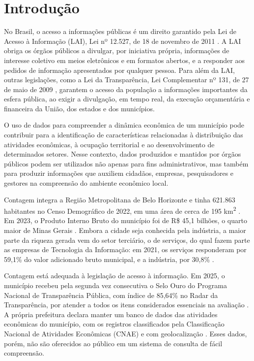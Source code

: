 \section{Introdução}

No Brasil, o acesso a informações públicas é um direito garantido pela Lei de Acesso à Informação (LAI), Lei nº 12.527, de 18 de novembro de 2011 \cite{brasil2011}.
A LAI obriga os órgãos públicos a divulgar, por iniciativa própria, informações de interesse coletivo em meios eletrônicos e em formatos abertos, e a responder aos pedidos de informação apresentados por qualquer pessoa.
Para além da LAI, outras legislações, como a Lei da Transparência, Lei Complementar nº 131, de 27 de maio de 2009 \cite{brasil2009}, garantem o acesso da população a informações importantes da esfera pública, ao exigir a divulgação, em tempo real, da execução orçamentária e financeira da União, dos estados e dos municípios.

O uso de dados para compreender a dinâmica econômica de um município pode contribuir para a identificação de características relacionadas à distribuição das atividades econômicas, à ocupação territorial e ao desenvolvimento de determinados setores.
Nesse contexto, dados produzidos e mantidos por órgãos públicos podem ser utilizados não apenas para fins administrativos, mas também para produzir informações que auxiliem cidadãos, empresas, pesquisadores e gestores na compreensão do ambiente econômico local.

Contagem integra a Região Metropolitana de Belo Horizonte e tinha 621.863 habitantes no Censo Demográfico de 2022, em uma área de cerca de 195 km\textsuperscript{2} \cite{ibge2026}.
Em 2023, o Produto Interno Bruto do município foi de R\$ 45,1 bilhões, o quarto maior de Minas Gerais \cite{ibge2026}.
Embora a cidade seja conhecida pela indústria, a maior parte da riqueza gerada vem do setor terciário, o de serviços, do qual fazem parte as empresas de Tecnologia da Informação: em 2021, os serviços responderam por 59,1\% do valor adicionado bruto municipal, e a indústria, por 30,8\% \cite{ibge2026}.

Contagem está adequada à legislação de acesso à informação.
Em 2025, o município recebeu pela segunda vez consecutiva o Selo Ouro do Programa Nacional de Transparência Pública, com índice de 85,64\% no Radar da Transparência, por atender a todos os itens considerados essenciais na avaliação \cite{contagem2025}.
A própria prefeitura declara manter um banco de dados das atividades econômicas do município, com os registros classificados pela Classificação Nacional de Atividades Econômicas (CNAE) e com geolocalização \cite{contagem2026}.
Esses dados, porém, não são oferecidos ao público em um sistema de consulta de fácil compreensão.

